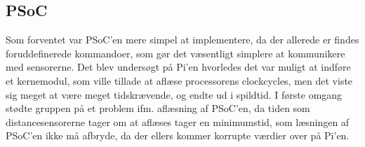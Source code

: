 \subsection{PSoC} \label{sec:swi_psoc_board}

Som forventet var PSoC'en mere simpel at implementere, da der allerede er findes foruddefinerede \IIC kommandoer, som gør det væsentligt simplere at kommunikere med sensorerne. Det blev undersøgt på Pi'en hvorledes det var muligt at indføre et kernemodul, som ville tillade at aflæse processorens clockcycles, men det viste sig meget at være meget tidskrævende, og endte ud i spildtid. I første omgang stødte gruppen på et problem ifm. aflæsning af PSoC'en, da tiden som distancesensorerne tager om at aflæses tager en minimumstid, som læsningen af PSoC'en ikke må afbryde, da der ellers kommer korrupte værdier over på Pi'en. 

